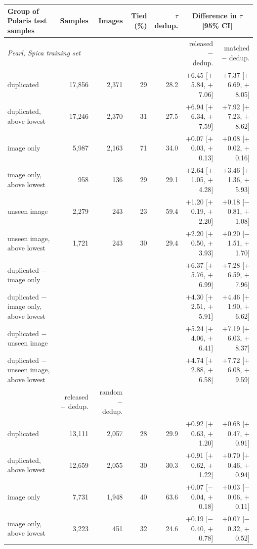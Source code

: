 \begin{tabular}{lrrrrrr}
\toprule
Group of Polaris test samples & Samples & Images & Tied (\%) & $\tau$ dedup. & \multicolumn{2}{c}{Difference in $\tau$ [95\% CI]} \\
\midrule
\multicolumn{5}{l}{\emph{Pearl, Spica training set}} & released $-$ dedup. & matched $-$ dedup. \\
\quad duplicated & 17,856 & 2,371 & 29 & 28.2 & $+$6.45 [$+$5.84, $+$7.06] & $+$7.37 [$+$6.69, $+$8.05] \\
\quad duplicated, above lowest & 17,246 & 2,370 & 31 & 27.5 & $+$6.94 [$+$6.34, $+$7.59] & $+$7.92 [$+$7.23, $+$8.62] \\
\quad image only & 5,987 & 2,163 & 71 & 34.0 & $+$0.07 [$+$0.03, $+$0.13] & $+$0.08 [$+$0.02, $+$0.16] \\
\quad image only, above lowest & 958 & 136 & 29 & 29.1 & $+$2.64 [$+$1.05, $+$4.28] & $+$3.46 [$+$1.36, $+$5.93] \\
\quad unseen image & 2,279 & 243 & 23 & 59.4 & $+$1.20 [$+$0.19, $+$2.20] & $+$0.18 [$-$0.81, $+$1.08] \\
\quad unseen image, above lowest & 1,721 & 243 & 30 & 29.4 & $+$2.20 [$+$0.50, $+$3.93] & $+$0.20 [$-$1.51, $+$1.70] \\
\quad duplicated $-$ image only & & & & & $+$6.37 [$+$5.76, $+$6.99] & $+$7.28 [$+$6.59, $+$7.96] \\
\quad duplicated $-$ image only, above lowest & & & & & $+$4.30 [$+$2.51, $+$5.91] & $+$4.46 [$+$1.90, $+$6.62] \\
\quad duplicated $-$ unseen image & & & & & $+$5.24 [$+$4.06, $+$6.41] & $+$7.19 [$+$6.03, $+$8.37] \\
\quad duplicated $-$ unseen image, above lowest & & & & & $+$4.74 [$+$2.88, $+$6.58] & $+$7.72 [$+$6.08, $+$9.59] \\
\addlinespace
\multicolumn{5}{l}{\emph{DENEB, Nebula training set}} & released $-$ dedup. & random $-$ dedup. \\
\quad duplicated & 13,111 & 2,057 & 28 & 29.9 & $+$0.92 [$+$0.63, $+$1.20] & $+$0.68 [$+$0.47, $+$0.91] \\
\quad duplicated, above lowest & 12,659 & 2,055 & 30 & 30.3 & $+$0.91 [$+$0.62, $+$1.22] & $+$0.70 [$+$0.46, $+$0.94] \\
\quad image only & 7,731 & 1,948 & 40 & 63.6 & $+$0.07 [$-$0.04, $+$0.18] & $+$0.03 [$-$0.06, $+$0.11] \\
\quad image only, above lowest & 3,223 & 451 & 32 & 24.6 & $+$0.19 [$-$0.40, $+$0.78] & $+$0.07 [$-$0.32, $+$0.52] \\

\end{tabular}
